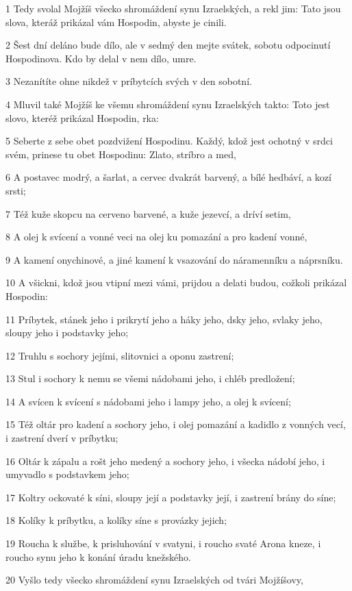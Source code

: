 \par 1 Tedy svolal Mojžíš všecko shromáždení synu Izraelských, a rekl jim: Tato jsou slova, kteráž prikázal vám Hospodin, abyste je cinili.
\par 2 Šest dní deláno bude dílo, ale v sedmý den mejte svátek, sobotu odpocinutí Hospodinova. Kdo by delal v nem dílo, umre.
\par 3 Nezanítíte ohne nikdež v príbytcích svých v den sobotní.
\par 4 Mluvil také Mojžíš ke všemu shromáždení synu Izraelských takto: Toto jest slovo, kteréž prikázal Hospodin, rka:
\par 5 Seberte z sebe obet pozdvižení Hospodinu. Každý, kdož jest ochotný v srdci svém, prinese tu obet Hospodinu: Zlato, stríbro a med,
\par 6 A postavec modrý, a šarlat, a cervec dvakrát barvený, a bílé hedbáví, a kozí srsti;
\par 7 Též kuže skopcu na cerveno barvené, a kuže jezevcí, a dríví setim,
\par 8 A olej k svícení a vonné veci na olej ku pomazání a pro kadení vonné,
\par 9 A kamení onychinové, a jiné kamení k vsazování do náramenníku a náprsníku.
\par 10 A všickni, kdož jsou vtipní mezi vámi, prijdou a delati budou, cožkoli prikázal Hospodin:
\par 11 Príbytek, stánek jeho i prikrytí jeho a háky jeho, dsky jeho, svlaky jeho, sloupy jeho i podstavky jeho;
\par 12 Truhlu s sochory jejími, slitovnici a oponu zastrení;
\par 13 Stul i sochory k nemu se všemi nádobami jeho, i chléb predložení;
\par 14 A svícen k svícení s nádobami jeho i lampy jeho, a olej k svícení;
\par 15 Též oltár pro kadení a sochory jeho, i olej pomazání a kadidlo z vonných vecí, i zastrení dverí v príbytku;
\par 16 Oltár k zápalu a rošt jeho medený a sochory jeho, i všecka nádobí jeho, i umyvadlo s podstavkem jeho;
\par 17 Koltry ockovaté k síni, sloupy její a podstavky její, i zastrení brány do síne;
\par 18 Kolíky k príbytku, a kolíky síne s provázky jejich;
\par 19 Roucha k službe, k prisluhování v svatyni, i roucho svaté Arona kneze, i roucho synu jeho k konání úradu knežského.
\par 20 Vyšlo tedy všecko shromáždení synu Izraelských od tvári Mojžíšovy,
